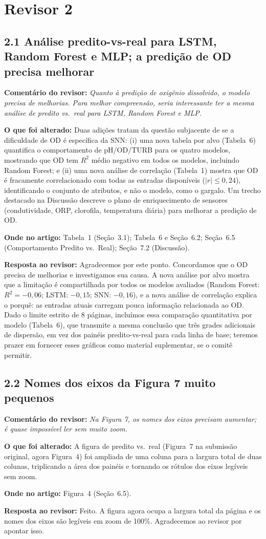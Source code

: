 \documentclass[11pt,a4paper]{article}
\newcommand{\comment}[1]{\textbf{Comentário do revisor:} \textit{#1}}
\newcommand{\change}[1]{\textbf{O que foi alterado:} #1}
\newcommand{\where}[1]{\textbf{Onde no artigo:} #1}
\newcommand{\resp}[1]{\textbf{Resposta ao revisor:} \textcolor{revblue}{#1}}
\newcommand{\pt}[1]{\subsection*{#1}}
\begin{document}
\section*{Revisor 2}

\pt{2.1 Análise predito-vs-real para LSTM, Random Forest e MLP; a predição de OD precisa melhorar}
\comment{Quanto à predição de oxigênio dissolvido, o modelo precisa de melhorias. Para melhor compreensão, seria interessante ter a mesma análise de predito vs.\ real para LSTM, Random Forest e MLP.}

\change{Duas adições tratam da questão subjacente de se a dificuldade de OD é específica da SNN: (i) uma nova tabela por alvo (Tabela~6) quantifica o comportamento de pH/OD/TURB para os quatro modelos, mostrando que OD tem $R^2$ médio negativo em todos os modelos, incluindo Random Forest; e (ii) uma nova análise de correlação (Tabela~1) mostra que OD é fracamente correlacionado com todas as entradas disponíveis ($|r| \leq 0{,}24$), identificando o conjunto de atributos, e não o modelo, como o gargalo. Um trecho destacado na Discussão descreve o plano de enriquecimento de sensores (condutividade, ORP, clorofila, temperatura diária) para melhorar a predição de OD.}

\where{Tabela~1 (Seção~3.1); Tabela~6 e Seção~6.2; Seção~6.5 (Comportamento Predito vs.\ Real); Seção~7.2 (Discussão).}

\resp{Agradecemos por este ponto. Concordamos que o OD precisa de melhorias e investigamos sua causa. A nova análise por alvo mostra que a limitação é compartilhada por todos os modelos avaliados (Random Forest: $R^2=-0{,}06$; LSTM: $-0{,}15$; SNN: $-0{,}16$), e a nova análise de correlação explica o porquê: as entradas atuais carregam pouca informação relacionada ao OD. Dado o limite estrito de 8 páginas, incluímos essa comparação quantitativa por modelo (Tabela~6), que transmite a mesma conclusão que três grades adicionais de dispersão, em vez dos painéis predito-vs-real para cada linha de base; teremos prazer em fornecer esses gráficos como material suplementar, se o comitê permitir.}

\pt{2.2 Nomes dos eixos da Figura 7 muito pequenos}
\comment{Na Figura 7, os nomes dos eixos precisam aumentar; é quase impossível ler sem muito zoom.}

\change{A figura de predito vs.\ real (Figura~7 na submissão original, agora Figura~4) foi ampliada de uma coluna para a largura total de duas colunas, triplicando a área dos painéis e tornando os rótulos dos eixos legíveis sem zoom.}

\where{Figura~4 (Seção~6.5).}

\resp{Feito. A figura agora ocupa a largura total da página e os nomes dos eixos são legíveis em zoom de 100\%. Agradecemos ao revisor por apontar isso.}
\end{document}
